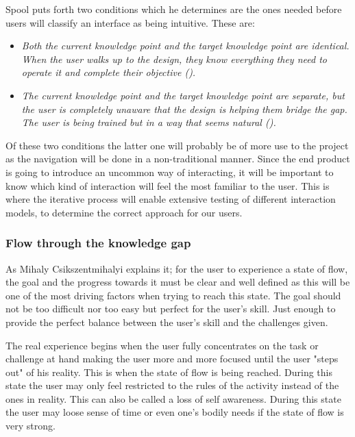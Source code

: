 Spool puts forth two conditions which he determines are the ones needed 
before users will classify an interface as being intuitive. These are:
\begin{itemize}
\item \textit{Both the current knowledge point and the target knowledge point are 
identical. When the user walks up to the design, they know everything they need 
to operate it and complete their objective (\cite{Spool}).}
\item \textit{The current knowledge point and the target knowledge point are 
separate, but the user is completely unaware that the design is helping them bridge 
the gap. The user is being trained but in a way that seems natural (\cite{Spool}).}
\end{itemize}\label{intuitiveConditions} 
Of these two conditions the latter one will probably be of more use to the 
project as the navigation will be done in a non-traditional manner. Since the end product is going to 
introduce an uncommon way of interacting, it will be important to know which kind 
of interaction will feel the most familiar to the user. This is where the iterative 
process will enable extensive testing of different interaction models, to 
determine the correct approach for our users.
\subsubsection{Flow through the knowledge gap}
\label{FlowTheory}

As Mihaly Csikszentmihalyi \cite{Flow} explains it; for the user to experience a state of flow, the goal and the progress towards it must be clear and well defined as this will be one of the most driving factors when trying to reach this state. The goal should not be too difficult nor too easy but perfect for the user's skill. Just enough to provide the perfect balance between the user's skill and the challenges given.\cite{Flow}
	
The real experience begins when the user fully concentrates on the task or challenge at hand making the user more and more focused until the user "steps out" of his reality. This is when the state of flow is being reached. \cite{Flow} During this state the user may only feel restricted to the rules of the activity instead of the ones in reality. This can also be called a loss of self awareness. During this state the user may loose sense of time or even one's bodily needs if the state of flow is very strong.\cite{Flow}
	
